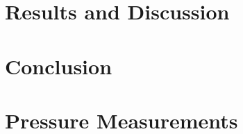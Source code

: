 \documentclass[runningheads]{llncs}
\begin{document}


\section{Results and Discussion}




\section{Conclusion}










\appendix
\section{Pressure Measurements}
\end{document}
